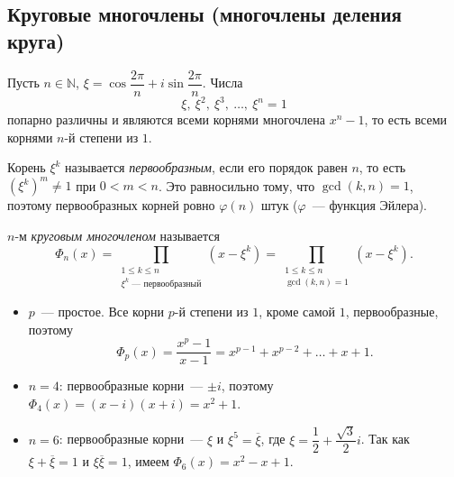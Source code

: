 \documentclass[12pt]{article}
\begin{document}
	\subsection{Круговые многочлены (многочлены деления круга)}

	\begin{definition}\label{def:roots-of-unity}
		Пусть $n \in \mathbb{N}$, $\xi = \cos\dfrac{2\pi}{n} + i\sin\dfrac{2\pi}{n}$. Числа
		\[
			\xi, \ \xi^2, \ \xi^3, \ \ldots, \ \xi^n = 1
		\]
		попарно различны и являются всеми корнями многочлена $x^n - 1$, то есть всеми корнями $n$-й степени из $1$.

		Корень $\xi^k$ называется \emph{первообразным}, если его порядок равен $n$, то есть $(\xi^k)^m \ne 1$ при $0 < m < n$. Это равносильно тому, что $\gcd(k, n) = 1$, поэтому первообразных корней ровно $\varphi(n)$ штук ($\varphi$~--- функция Эйлера).
	\end{definition}

	\begin{definition}\label{def:cyclotomic}
		$n$-м \emph{круговым многочленом} называется
		\[
			\Phi_n(x) = \prod_{\substack{1 \leqslant k \leqslant n \\ \xi^k\text{~--- первообразный}}} (x - \xi^k) = \prod_{\substack{1 \leqslant k \leqslant n \\ \gcd(k, n) = 1}} (x - \xi^k).
		\]
	\end{definition}

	\begin{example}
		\begin{itemize}
			\item $p$~--- простое. Все корни $p$-й степени из $1$, кроме самой $1$, первообразные, поэтому
			\[
				\Phi_p(x) = \dfrac{x^p - 1}{x - 1} = x^{p-1} + x^{p-2} + \ldots + x + 1.
			\]
			\item $n = 4$: первообразные корни~--- $\pm i$, поэтому $\Phi_4(x) = (x - i)(x + i) = x^2 + 1$.
			\item $n = 6$: первообразные корни~--- $\xi$ и $\xi^5 = \overline{\xi}$, где $\xi = \dfrac{1}{2} + \dfrac{\sqrt{3}}{2}i$. Так как $\xi + \overline{\xi} = 1$ и $\xi\overline{\xi} = 1$, имеем $\Phi_6(x) = x^2 - x + 1$.
		\end{itemize}
	\end{example}
\end{document}
